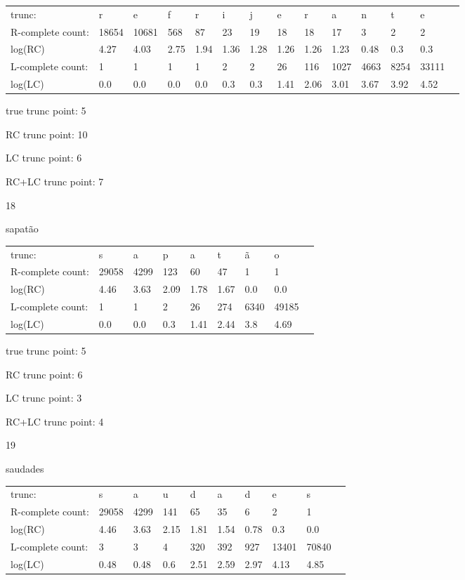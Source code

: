 \documentclass{article}
\begin{document}
\begin{tabular}{l|lllllllllllll}
trunc: & r & e & f & r & i & j & e & r & a & n & t & e & \\ 
R-complete count: & 18654 & 10681 & 568 & 87 & 23 & 19 & 18 & 18 & 17 & 3 & 2 & 2 & \\ 
log(RC) & 4.27 & 4.03 & 2.75 & 1.94 & 1.36 & 1.28 & 1.26 & 1.26 & 1.23 & 0.48 & 0.3 & 0.3 & \\ 
L-complete count: & 1 & 1 & 1 & 1 & 2 & 2 & 26 & 116 & 1027 & 4663 & 8254 & 33111 & \\ 
log(LC) & 0.0 & 0.0 & 0.0 & 0.0 & 0.3 & 0.3 & 1.41 & 2.06 & 3.01 & 3.67 & 3.92 & 4.52 & \\ 
\end{tabular}

true trunc point: 5

RC trunc point: 10

LC trunc point: 6

RC+LC trunc point: 7

\vspace{1em}

18

sapatão

\begin{tabular}{l|llllllll}
trunc: & s & a & p & a & t & ã & o & \\ 
R-complete count: & 29058 & 4299 & 123 & 60 & 47 & 1 & 1 & \\ 
log(RC) & 4.46 & 3.63 & 2.09 & 1.78 & 1.67 & 0.0 & 0.0 & \\ 
L-complete count: & 1 & 1 & 2 & 26 & 274 & 6340 & 49185 & \\ 
log(LC) & 0.0 & 0.0 & 0.3 & 1.41 & 2.44 & 3.8 & 4.69 & \\ 
\end{tabular}

true trunc point: 5

RC trunc point: 6

LC trunc point: 3

RC+LC trunc point: 4

\vspace{1em}

19

saudades

\begin{tabular}{l|lllllllll}
trunc: & s & a & u & d & a & d & e & s & \\ 
R-complete count: & 29058 & 4299 & 141 & 65 & 35 & 6 & 2 & 1 & \\ 
log(RC) & 4.46 & 3.63 & 2.15 & 1.81 & 1.54 & 0.78 & 0.3 & 0.0 & \\ 
L-complete count: & 3 & 3 & 4 & 320 & 392 & 927 & 13401 & 70840 & \\ 
log(LC) & 0.48 & 0.48 & 0.6 & 2.51 & 2.59 & 2.97 & 4.13 & 4.85 & \\ 
\end{tabular}
\end{document}
